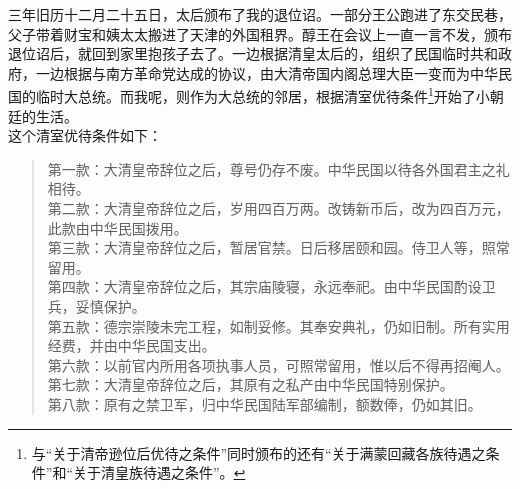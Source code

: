 三年旧历十二月二十五日，太后颁布了我的退位诏。一部分王公跑进了东交民巷，父子带着财宝和姨太太搬进了天津的外国租界。醇王在会议上一直一言不发，颁布退位诏后，就回到家里抱孩子去了。一边根据清皇太后的，组织了民国临时共和政府，一边根据与南方革命党达成的协议，由大清帝国内阁总理大臣一变而为中华民国的临时大总统。而我呢，则作为大总统的邻居，根据清室优待条件\footnote{与“关于清帝逊位后优待之条件”同时颁布的还有“关于满蒙回藏各族待遇之条件”和“关于清皇族待遇之条件”。}开始了小朝廷的生活。\\

这个清室优待条件如下：\\

\begin{quote}
	第一款：大清皇帝辞位之后，尊号仍存不废。中华民国以待各外国君主之礼相待。\\

第二款：大清皇帝辞位之后，岁用四百万两。改铸新币后，改为四百万元，此款由中华民国拨用。\\

第三款：大清皇帝辞位之后，暂居官禁。日后移居颐和园。侍卫人等，照常留用。\\

第四款：大清皇帝辞位之后，其宗庙陵寝，永远奉祀。由中华民国酌设卫兵，妥慎保护。\\

第五款：德宗崇陵未完工程，如制妥修。其奉安典礼，仍如旧制。所有实用经费，并由中华民国支出。\\

第六款：以前官内所用各项执事人员，可照常留用，惟以后不得再招阉人。\\

第七款：大清皇帝辞位之后，其原有之私产由中华民国特别保护。\\

第八款：原有之禁卫军，归中华民国陆军部编制，额数俸，仍如其旧。\\
\end{quote}
